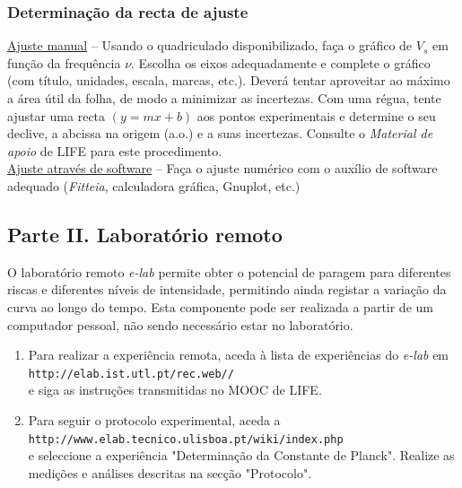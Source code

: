 \documentclass[12pt,a4paper,oneside]{paper}
\begin{document}
\subsubsection*{\sf Determinação da recta de ajuste}
\underline{Ajuste manual} -- Usando o quadriculado disponibilizado, faça o gráfico de $V_s$ em função da frequência $\nu$.
Escolha os eixos adequadamente e complete o gráfico (com título, unidades, escala, marcas, etc.). Deverá tentar aproveitar
ao máximo a área útil da folha, de modo a minimizar as incertezas. Com uma régua, tente ajustar uma recta $(y=mx + b)$ aos
pontos experimentais e determine o seu declive, a  abcissa na origem (a.o.) e a suas incertezas. Consulte o \emph{Material de apoio}
de LIFE para este procedimento.\\
\underline{Ajuste através de software} -- Faça o ajuste numérico com o auxílio de software adequado (\emph{Fitteia}, calculadora
gráfica, Gnuplot, etc.) 


\subsection*{\sf Parte II. Laboratório remoto}
O laboratório remoto \emph{e-lab} permite obter o potencial de paragem para diferentes riscas e diferentes níveis de intensidade,
permitindo ainda registar a variação da curva ao longo do tempo. Esta componente pode ser realizada a partir de um computador
pessoal, não sendo necessário estar no laboratório.\\

\begin{enumerate}
\item Para realizar a experiência remota,  aceda à lista de experiências do \emph{e-lab} em\\
\texttt{http://elab.ist.utl.pt/rec.web//}\\
e siga as instruções transmitidas no MOOC de LIFE.
\item Para seguir o protocolo experimental, aceda a\\ 
\texttt{http://www.elab.tecnico.ulisboa.pt/wiki/index.php}\\
e seleccione a experiência "Determinação da Constante de Planck". Realize as medições e análises descritas na secção "Protocolo".
\end{enumerate}

	
\newpage
\def\width{15}
\def\hauteur{25}


\newpage
\end{document}

